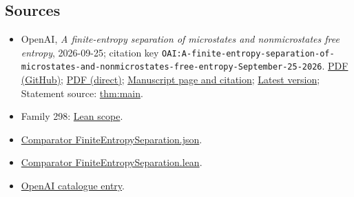 \documentclass[11pt]{article}
\begin{document}
\subsection{Sources}
\begin{itemize}
\item OpenAI, \emph{A finite-entropy separation of microstates and nonmicrostates free entropy}, 2026-09-25; citation key \texttt{OAI:A-finite-entropy-separation-of-microstates-and-nonmicrostates-free-entropy-September-25-2026}. \href{https://github.com/openai/math/blob/adc7f1241b42e322a6451854ab7e4b4c146bf78a/preprints/A-finite-entropy-separation-of-microstates-and-nonmicrostates-free-entropy-September-25-2026/paper.pdf}{PDF (GitHub)}; \href{https://github.com/openai/math/raw/adc7f1241b42e322a6451854ab7e4b4c146bf78a/preprints/A-finite-entropy-separation-of-microstates-and-nonmicrostates-free-entropy-September-25-2026/paper.pdf}{PDF (direct)}; \href{https://github.com/openai/math/blob/adc7f1241b42e322a6451854ab7e4b4c146bf78a/preprints/A-finite-entropy-separation-of-microstates-and-nonmicrostates-free-entropy-September-25-2026/README.md}{Manuscript page and citation}; \href{https://github.com/openai/math/blob/main/preprints/A-finite-entropy-separation-of-microstates-and-nonmicrostates-free-entropy-September-25-2026/paper.pdf}{Latest version}; Statement source: \href{https://github.com/openai/math/blob/adc7f1241b42e322a6451854ab7e4b4c146bf78a/preprints/A-finite-entropy-separation-of-microstates-and-nonmicrostates-free-entropy-September-25-2026/build/sections/01-introduction.tex\#L42}{thm:main}.
\item Family 298: \href{https://github.com/openai/math/blob/adc7f1241b42e322a6451854ab7e4b4c146bf78a/lean/docs/298.md}{Lean scope}.
\item \href{https://github.com/openai/math/blob/adc7f1241b42e322a6451854ab7e4b4c146bf78a/lean/ComparatorChallenges/FiniteEntropySeparation.json}{Comparator FiniteEntropySeparation.json}.
\item \href{https://github.com/openai/math/blob/adc7f1241b42e322a6451854ab7e4b4c146bf78a/lean/ComparatorChallenges/FiniteEntropySeparation.lean}{Comparator FiniteEntropySeparation.lean}.
\item \href{https://github.com/openai/math/blob/adc7f1241b42e322a6451854ab7e4b4c146bf78a/CONTENTS.md}{OpenAI catalogue entry}.
\end{itemize}
\end{document}
